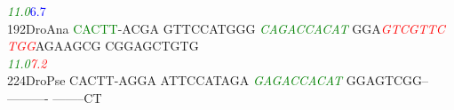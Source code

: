 \documentclass[11pt,twoside,reqno,a4paper]{article}
\begin{document}
{\hspace*{4\charwidth}\hspace*{7\charwidth}\hspace*{1\charwidth}\hspace*{1\charwidth}\hspace*{20\charwidth}\textit{\textcolor{Green}{11.0}}\hspace*{1\charwidth}\hspace*{1\charwidth}\hspace*{16\charwidth}\textcolor{Blue}{6.7}\hspace*{1\charwidth}\hspace*{1\charwidth}\\
192\hspace*{1\charwidth}DroAna	\textcolor{Green}{C}\textcolor{Green}{A}\textcolor{Green}{C}\textcolor{Green}{T}\textcolor{Green}{T}-ACGA	GTTCCATGGG	\textit{\textcolor{Green}{C}}\textit{\textcolor{Green}{A}}\textit{\textcolor{Green}{G}}\textit{\textcolor{Green}{A}}\textit{\textcolor{Green}{C}}\textit{\textcolor{Green}{C}}\textit{\textcolor{Green}{A}}\textit{\textcolor{Green}{C}}\textit{\textcolor{Green}{A}}\textit{\textcolor{Green}{T}}	GGA\textit{\textcolor{Red}{G}}\textit{\textcolor{Red}{T}}\textit{\textcolor{Red}{C}}\textit{\textcolor{Red}{G}}\textit{\textcolor{Red}{T}}\textit{\textcolor{Red}{T}}\textit{\textcolor{Red}{C}}	\textit{\textcolor{Red}{T}}\textit{\textcolor{Red}{G}}\textit{\textcolor{Red}{G}}AGAAGCG	CGGAGCTGTG	\\
\hspace*{4\charwidth}\hspace*{7\charwidth}\hspace*{1\charwidth}\hspace*{1\charwidth}\hspace*{20\charwidth}\textit{\textcolor{Green}{11.0}}\hspace*{1\charwidth}\hspace*{9\charwidth}\textit{\textcolor{Red}{7.2}}\hspace*{1\charwidth}\hspace*{1\charwidth}\hspace*{1\charwidth}\\
224\hspace*{1\charwidth}DroPse	CACTT-AGGA	ATTCCATAGA	\textit{\textcolor{Green}{G}}\textit{\textcolor{Green}{A}}\textit{\textcolor{Green}{G}}\textit{\textcolor{Green}{A}}\textit{\textcolor{Green}{C}}\textit{\textcolor{Green}{C}}\textit{\textcolor{Green}{A}}\textit{\textcolor{Green}{C}}\textit{\textcolor{Green}{A}}\textit{\textcolor{Green}{T}}	GGAGTCGG--	----------	--------CT	\\
}
\end{document}
